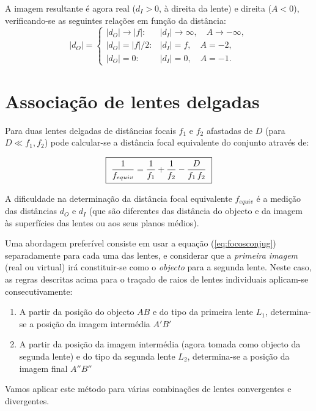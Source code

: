 \documentclass[a4paper,twoside,11pt]{report}      %
\begin{document}
A imagem resultante é agora real ($d_I>0$, à direita da lente) e direita ($A<0$), verificando-se as seguintes relações em função da distância:
\begin{equation}
|d_O|  =  \left\{
\begin{array}{rl}
|d_O|   \to |f|:  &   |d_I| \to \infty, \quad A \to -\infty ,\\
|d_O|   = |f|/2:  &   |d_I| = f, \quad A =-2  ,\\
|d_O|  =0:  & |d_I|  =0 , \quad A=-1.
\end{array}  \right.
\end{equation}




\section{\sf Associação de lentes delgadas}

Para duas lentes delgadas de distâncias focais $f_1$ e $f_2$ afastadas de $D$ (para $D \ll f_1,f_2$) pode calcular-se a distância focal equivalente do conjunto através de: 

 \begin{equation}
	\label{eq:assoclentes}
    \fbox{
        $ \displaystyle
	\frac{1}{f_{equiv}} = \frac{1}{f_1} + \frac{1}{f_2} - \frac{D}{f_1 \,f_2} 
        $
    }
\end{equation}

A dificuldade
na determinação da distância focal equivalente ${f_{equiv}}$ é a medição das distâncias $d_O$ e $d_I$ 
(que são diferentes das distância do objecto e da imagem às superfícies das lentes ou aos seus planos médios).

Uma abordagem preferível consiste em usar a equação (\ref{eq:focosconjug}) separadamente para cada uma das lentes, e considerar que a \emph{primeira imagem} (real ou virtual) irá constituir-se como o \emph{objecto} para a segunda lente. Neste caso, as regras descritas acima para o traçado de raios de lentes individuais aplicam-se consecutivamente:
\begin{enumerate}
\item  A partir da posição do objecto $AB$ e do tipo da primeira lente $L_1$, determina-se a posição da imagem intermédia $A'B'$
\item  A partir da posição da imagem intermédia (agora tomada como objecto da segunda lente) e do tipo da segunda lente $L_2$, determina-se a posição da imagem final $A''B''$
\end{enumerate}
Vamos aplicar este método para várias combinações de lentes convergentes e divergentes.
\end{document}
